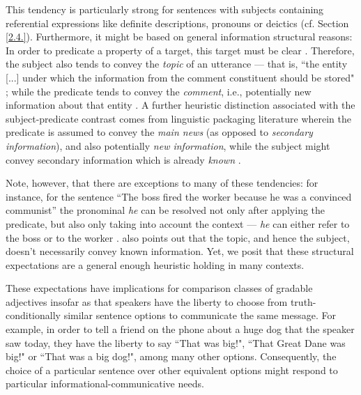 This tendency is particularly strong for sentences with subjects containing referential expressions like definite descriptions, pronouns or deictics (cf. Section \ref{2.4.}). Furthermore, it might be based on general information structural reasons: In order to predicate a property of a target, this target must be clear \parencite{searle1969speech, krifka2008basic}. Therefore, the subject also tends to convey the \textit{topic} of an utterance --- that is, ``the entity [...] under which the information from the comment constituent should be stored" \parencite[p. 265]{krifka2008basic}; while the predicate tends to convey the \textit{comment},  i.e., potentially new information about that entity \parencite{krifka2008basic, chafe1976givenness, Reboul2001}. A further heuristic distinction associated with the subject-predicate contrast comes from linguistic packaging literature wherein the predicate is assumed to convey the \textit{main news} (as opposed to \textit{secondary information}), and also potentially \textit{new information}, while the subject might convey secondary information which is already \textit{known} \parencite{kaiser2020}. 

Note, however, that there are exceptions to many of these tendencies: for instance, for the sentence “The boss fired the worker because he was a convinced communist” the pronominal \emph{he} can be resolved not only after applying the predicate, but also only taking into account the context --- \emph{he} can either refer to the boss or to the worker \parencite{Reboul2001}. \textcite{krifka2008basic} also points out that the topic, and hence the subject,  doesn't necessarily convey known information.
Yet, we posit that these structural expectations are a general enough heuristic holding in many contexts.

These expectations have implications for comparison classes of gradable adjectives insofar as that speakers have the liberty to choose from truth-conditionally similar sentence options to communicate the same message. For example, in order to tell a friend on the phone about a huge dog that the speaker saw today, they have the liberty to say ``That was big!", ``That Great Dane was big!" or ``That was a big dog!", among many other options. Consequently, the choice of a particular sentence over other equivalent options might respond to particular informational-communicative needs. 

